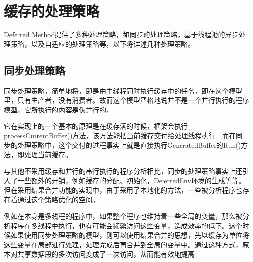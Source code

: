\section{缓存的处理策略}

Deferred Method提供了多种处理策略，如同步的处理策略，基于线程池的异步处理策略，以及自适应的处理策略等。以下将详述几种处理策略。

\subsection{同步处理策略}

同步处理策略，简单地将，即是由主线程同时执行缓存中的任务，即在这个模型里，只有生产者，没有消费者。故而这个模型严格地说并不是一个并行执行的程序模型，它所执行的内容是伪并行的。

它在实现上的一个基本的原理是在缓存满的时候，框架会执行processCurrentBuffer()方法，该方法能把当前缓存交付给处理线程执行，而在同步的处理策略中，这个交付的过程事实上就是直接执行GeneratedBuffer的Run()方法，即处理当前缓存。

与其他不采用缓存和并行的串行执行的程序分析相比，同步的处理策略事实上还引入了一些额外的开销，例如缓存的分配、初始化，DeferredEnv环境的生成等等。但在采用结果合并功能的实现中，由于采用了本地化的方法，一些被分析程序也存在着通过这个策略优化的空间。

例如在本身是多线程的程序中，如果整个程序也维持着一些全局的变量，那么被分析程序在多线程中执行，也有可能会频繁访问这些变量，造成效率的低下。这个时候如果使用同步处理策略的模型，则可以使用结果合并的思想，先以缓存为单位将这些变量在局部进行处理，处理完成后再合并到全局的变量中。通过这种方式，原本对共享数据段的多次访问变成了一次访问，从而能有效地提高
